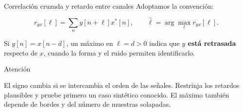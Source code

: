 \documentclass[
  10pt,
  ignorenonframetext,
  aspectratio=169,
  spanish,
]{beamer}
\begin{document}
\begin{frame}{Correlación cruzada y retardo entre canales}
\label{d1-058}
Adoptamos la convención:

\[r_{yx}[\ell]=\sum_n y[n+\ell]x^*[n],\qquad
\hat\ell=\arg\max_\ell r_{yx}[\ell].\]

Si \(y[n]=x[n-d]\), un máximo en \(\ell=d>0\) indica que \textbf{\(y\)
está retrasada} respecto de \(x\), cuando la forma y el ruido permiten
identificarlo.

\begin{alertblock}{Atención}

El signo cambia si se intercambia el orden de las señales. Restrinja los
retardos plausibles y pruebe primero un caso sintético conocido. El
máximo también depende de bordes y del número de muestras solapadas.

\end{alertblock}

\end{frame}
\end{document}

